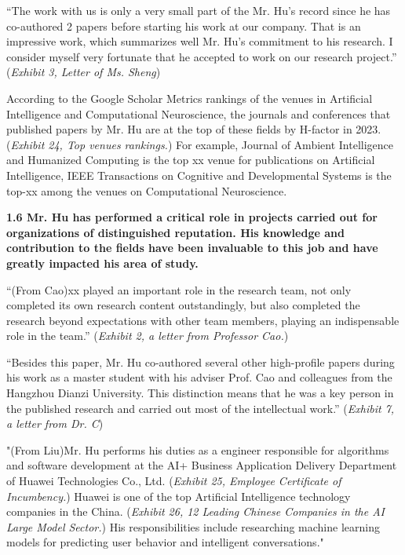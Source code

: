 \documentclass{article}
\begin{document}
“The work with us is only a very small part of the Mr. Hu’s record since he has co-authored 2 papers before starting his work at our company. That is an impressive work, which summarizes well Mr. Hu’s commitment to his research. I consider myself very fortunate that he accepted to work on our research project.” ({\it Exhibit 3, Letter of Ms. Sheng})

According to the Google Scholar Metrics rankings of the venues in Artificial Intelligence and Computational Neuroscience, the journals and conferences that published papers by Mr. Hu are at the top of these fields by H-factor in 2023. ({\it Exhibit 24, Top venues rankings.}) For example, Journal of Ambient Intelligence and Humanized Computing is the top xx venue for publications on Artificial Intelligence, IEEE Transactions on Cognitive and Developmental Systems is the top-xx among the venues on Computational Neuroscience.

{\bf 1.6 Mr. Hu has performed a critical role in projects carried out for organizations of distinguished reputation. His knowledge and contribution to the fields have been invaluable to this job and have greatly impacted his area of study. }

“(From Cao)xx played an important role in the research team, not only completed its own research content outstandingly, but also completed the research beyond expectations with other team members, playing an indispensable role in the team.” ({\it Exhibit 2, a letter from Professor Cao.}) 

“Besides this paper, Mr. Hu co-authored several other high-profile papers during his work as a master student with his adviser Prof. Cao and colleagues from the Hangzhou Dianzi University. This distinction means that he was a key person in the published research and carried out most of the intellectual work.” ({\it Exhibit 7, a letter from Dr. C}) 

"(From Liu)Mr. Hu performs his duties as a engineer responsible for algorithms and software development at the AI+ Business Application Delivery Department of Huawei Technologies Co., Ltd. ({\it Exhibit 25, Employee Certificate of Incumbency.}) Huawei is one of the top Artificial Intelligence technology companies in the China. ({\it Exhibit 26, 12 Leading Chinese Companies in the AI Large Model Sector.}) His responsibilities include researching machine learning models for predicting user behavior and intelligent conversations."
\end{document}
